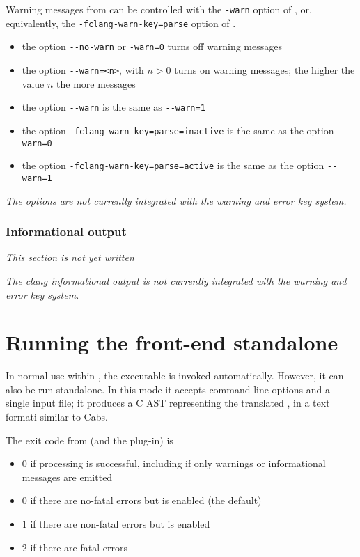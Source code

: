 Warning messages from \irg can be controlled with the \lstinline|-warn| option of \irg, or, equivalently, the \lstinline|-fclang-warn-key=parse| option of \fc.

\begin{itemize}
\item the \irg option \lstinline|--no-warn| or \lstinline|-warn=0| turns off \irg warning messages
\item the \irg option \lstinline|--warn=<n>|, with $n > 0$ turns on \irg warning messages; the higher the value $n$ the more messages
\item the \irg option \lstinline|--warn| is the same as \lstinline|--warn=1|
\item the \fc option \lstinline|-fclang-warn-key=parse=inactive| is the same as the \irg option  \lstinline|--warn=0|
\item the \fc option \lstinline|-fclang-warn-key=parse=active| is the same as the \irg option  \lstinline|--warn=1|
\end{itemize}

\textit{The \clang options are not currently integrated with the \fc warning and error key system.}

\subsection{Informational output}

\textit{This section is not yet written}

\textit{The clang informational output is not currently integrated with the \fc warning and error key system.}

\chapter{Running the \fclang front-end standalone}
\label{sec:standalone}

In normal use within \framac, the \irg executable is
invoked automatically. However, it can also be run standalone.
In this mode it accepts command-line options and a single input file;
it produces a C AST representing the translated \cpp, in a text formati similar to Cabs.

The exit code from \irg (and the \fclang plug-in) is
\begin{itemize}
\item 0 if processing is successful, including if only warnings or informational messages are emitted
\item 0 if there are no-fatal errors but  is enabled (the default)
\item 1 if there are non-fatal errors but  is enabled
\item 2 if there are fatal errors
\end{itemize}


